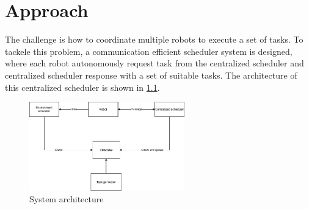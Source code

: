 \chapter{Approach}





The challenge is how to coordinate multiple robots to execute a set of tasks. To tackele this problem, a communication efficient scheduler system is designed, where each robot autonomously request task from the centralized scheduler and centralized scheduler response with a set of suitable tasks. The architecture of this centralized scheduler is shown in \ref{fig:system_architecture}.


\begin{figure}[htb]
	\centering
	\includegraphics[width = 0.6\textwidth]{content/images/ch3/architecture.drawio.png}
	\caption{System architecture}
	\label{fig:system_architecture}
\end{figure}

